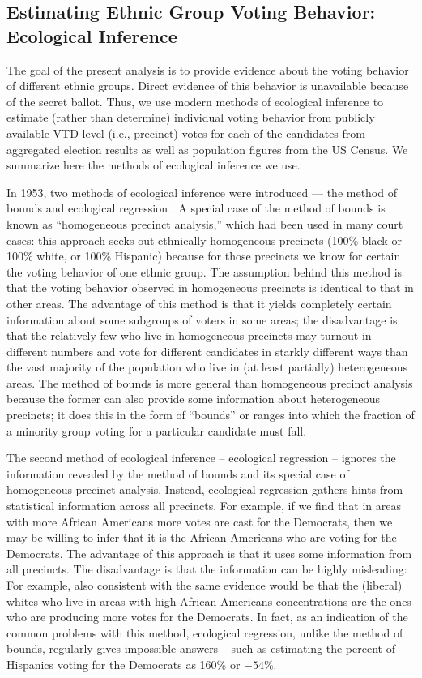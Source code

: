 \documentclass[12pt]{article}
\begin{document}
\subsection{Estimating Ethnic Group Voting Behavior: Ecological Inference}
\label{s:ei}

The goal of the present analysis is to provide evidence about the
voting behavior of different ethnic groups. Direct evidence of this
behavior is unavailable because of the secret ballot. Thus, we use
modern methods of ecological inference to estimate (rather than
determine) individual voting behavior from publicly available
VTD-level (i.e., precinct) votes for each of the candidates from
aggregated election results as well as population figures from the US
Census.  We summarize here the methods of ecological inference we use.

In 1953, two methods of ecological inference were introduced --- the
method of bounds \citep{DunDav53} and ecological regression
\citep{Goodman53}. A special case of the method of bounds is known
as ``homogeneous precinct analysis,'' which had been used in many
court cases: this approach seeks out ethnically homogeneous precincts
(100\% black or 100\% white, or 100\% Hispanic) because for those
precincts we know for certain the voting behavior of one ethnic group.
The assumption behind this method is that the voting behavior observed
in homogeneous precincts is identical to that in other areas. The
advantage of this method is that it yields completely certain
information about some subgroups of voters in some areas; the
disadvantage is that the relatively few who live in homogeneous
precincts may turnout in different numbers and vote for different
candidates in starkly different ways than the vast majority of the
population who live in (at least partially) heterogeneous areas.  The
method of bounds is more general than homogeneous precinct analysis
because the former can also provide some information about
heterogeneous precincts; it does this in the form of ``bounds'' or
ranges into which the fraction of a minority group voting for a
particular candidate must fall.

The second method of ecological inference -- ecological regression --
ignores the information revealed by the method of bounds and its
special case of homogeneous precinct analysis. Instead, ecological
regression gathers hints from statistical information across all
precincts. For example, if we find that in areas with more African
Americans more votes are cast for the Democrats, then we may be
willing to infer that it is the African Americans who are voting for
the Democrats. The advantage of this approach is that it uses some
information from all precincts. The disadvantage is that the
information can be highly misleading: For example, also consistent
with the same evidence would be that the (liberal) whites who live in
areas with high African Americans concentrations are the ones who are
producing more votes for the Democrats. In fact, as an indication of
the common problems with this method, ecological regression, unlike
the method of bounds, regularly gives impossible answers -- such as
estimating the percent of Hispanics voting for the Democrats as 160\%
or $-54$\%.
\end{document}
